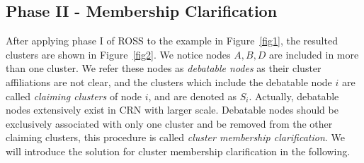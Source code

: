 \documentclass[10pt,journal,compsoc]{IEEEtran}
\makeatletter
\theoremstyle{mytheoremstyle}
\theoremstyle{mytheoremstyle}
\theoremstyle{mytheoremstyle}
\renewenvironment{proof}[1][\proofname]{%
      \par\pushQED{\qed}\fontfamily{ptm}\selectfont%
      \topsep6\p@\@plus6\p@\relax
      \trivlist\item[\hskip\labelsep\bfseries#1\@addpunct{.}]%
      \ignorespaces
    }{%
      \popQED\endtrivlist\@endpefalse
    }
\makeatother
\begin{document}
\subsection{Phase II - Membership Clarification}
\label{membershipClarification}
After applying phase I of ROSS to the example in Figure~\ref{fig1}, the resulted clusters are shown in Figure~\ref{fig2}.
We notice nodes $A, B, D$ are included in more than one cluster. 
We refer these nodes as \textit{debatable nodes} as their cluster affiliations are not clear, and the clusters which include the debatable node $i$ are called \textit{claiming clusters} of node $i$, and are denoted as $S_i$.  
Actually, debatable nodes extensively exist in CRN with larger scale.
Debatable nodes should be exclusively associated with only one cluster and be removed from the other claiming clusters, this procedure is called \textit{cluster membership clarification}.
We will introduce the solution for cluster membership clarification in the following.	







%

\end{document}
